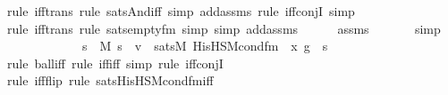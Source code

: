 \begin{isabellebody}
{\isacharparenleft}{\kern0pt}rule\ iff{\isacharunderscore}{\kern0pt}trans{\isacharcomma}{\kern0pt}\ rule\ sats{\isacharunderscore}{\kern0pt}And{\isacharunderscore}{\kern0pt}iff{\isacharcomma}{\kern0pt}\ simp\ add{\isacharcolon}{\kern0pt}assms{\isacharcomma}{\kern0pt}\ rule\ iff{\isacharunderscore}{\kern0pt}conjI{\isacharcomma}{\kern0pt}\ simp{\isacharparenright}{\kern0pt}\isanewline
\ \ \ \ \isamarkupfalse%
{\isacharparenleft}{\kern0pt}rule\ iff{\isacharunderscore}{\kern0pt}trans{\isacharcomma}{\kern0pt}\ rule\ sats{\isacharunderscore}{\kern0pt}empty{\isacharunderscore}{\kern0pt}fm{\isacharcomma}{\kern0pt}\ simp{\isacharcomma}{\kern0pt}\ simp\ add{\isacharcolon}{\kern0pt}assms{\isacharparenright}{\kern0pt}\isanewline
\ \ \ \ \isamarkupfalse%
\ assms\ \isanewline
\ \ \ \ \isamarkupfalse%
\ simp\isanewline
\ \ \ \ \isamarkupfalse%
\isanewline
\isanewline
\ \ \isamarkupfalse%
\ \isamarkupfalse%
\ {\isachardoublequoteopen}{\isachardot}{\kern0pt}{\isachardot}{\kern0pt}{\isachardot}{\kern0pt}\ {\isasymlongleftrightarrow}\ {\isacharparenleft}{\kern0pt}{\isasymforall}s\ {\isasymin}\ M{\isachardot}{\kern0pt}\ s\ {\isasymin}\ v\ {\isasymlongleftrightarrow}\ sats{\isacharparenleft}{\kern0pt}M{\isacharcomma}{\kern0pt}\ His{\isacharunderscore}{\kern0pt}HS{\isacharunderscore}{\kern0pt}M{\isacharunderscore}{\kern0pt}cond{\isacharunderscore}{\kern0pt}fm{\isacharparenleft}{\kern0pt}{}{\isacharcomma}{\kern0pt}\ {}{\isacharparenright}{\kern0pt}{\isacharcomma}{\kern0pt}\ {\isacharbrackleft}{\kern0pt}x{\isacharprime}{\kern0pt}{\isacharcomma}{\kern0pt}\ g{\isacharbrackright}{\kern0pt}{\isacharparenright}{\kern0pt}\ {\isasymand}\ s\ {\isacharequal}{\kern0pt}\ {}{\isacharparenright}{\kern0pt}{\isachardoublequoteclose}\ \isanewline
\ \ \ \ \isamarkupfalse%
{\isacharparenleft}{\kern0pt}rule\ ball{\isacharunderscore}{\kern0pt}iff{\isacharcomma}{\kern0pt}\ rule\ iff{\isacharunderscore}{\kern0pt}iff{\isacharcomma}{\kern0pt}\ simp{\isacharcomma}{\kern0pt}\ rule\ iff{\isacharunderscore}{\kern0pt}conjI{\isacharparenright}{\kern0pt}\isanewline
\ \ \ \ \ \isamarkupfalse%
{\isacharparenleft}{\kern0pt}rule\ iff{\isacharunderscore}{\kern0pt}flip{\isacharcomma}{\kern0pt}\ rule\ sats{\isacharunderscore}{\kern0pt}His{\isacharunderscore}{\kern0pt}HS{\isacharunderscore}{\kern0pt}M{\isacharunderscore}{\kern0pt}cond{\isacharunderscore}{\kern0pt}fm{\isacharprime}{\kern0pt}{\isacharunderscore}{\kern0pt}iff{\isacharparenright}{\kern0pt}\isanewline

\end{isabellebody}
